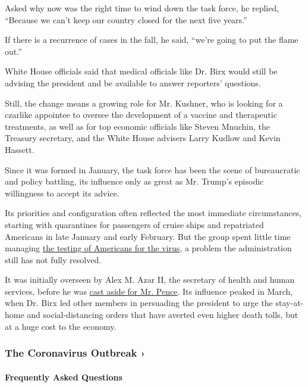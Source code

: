 Asked why now was the right time to wind down the task force, he
replied, ``Because we can't keep our country closed for the next five
years.''

If there is a recurrence of cases in the fall, he said, ``we're going to
put the flame out.''

White House officials said that medical officials like Dr. Birx would
still be advising the president and be available to answer reporters'
questions.

Still, the change means a growing role for Mr. Kushner, who is looking
for a czarlike appointee to oversee the development of a vaccine and
therapeutic treatments, as well as for top economic officials like
Steven Mnuchin, the Treasury secretary, and the White House advisers
Larry Kudlow and Kevin Hassett.

Since it was formed in January, the task force has been the scene of
bureaucratic and policy battling, its influence only as great as Mr.
Trump's episodic willingness to accept its advice.

Its priorities and configuration often reflected the most immediate
circumstances, starting with quarantines for passengers of cruise ships
and repatriated Americans in late January and early February. But the
group spent little time managing
\href{https://www.nytimes3xbfgragh.onion/2020/03/28/us/testing-coronavirus-pandemic.html}{the
testing of Americans for the virus}, a problem the administration still
has not fully resolved.

It was initially overseen by Alex M. Azar II, the secretary of health
and human services, before he was
\href{https://www.nytimes3xbfgragh.onion/2020/02/26/us/politics/trump-coronavirus-cdc.html}{cast
aside for Mr. Pence}. Its influence peaked in March, when Dr. Birx led
other members in persuading the president to urge the stay-at-home and
social-distancing orders that have averted even higher death tolls, but
at a huge cost to the economy.

\href{https://www.nytimes3xbfgragh.onion/news-event/coronavirus?action=click\&pgtype=Article\&state=default\&region=MAIN_CONTENT_3\&context=storylines_faq}{}

\hypertarget{the-coronavirus-outbreak-}{%
\subsubsection{The Coronavirus Outbreak
›}\label{the-coronavirus-outbreak-}}

\hypertarget{frequently-asked-questions}{%
\paragraph{Frequently Asked
Questions}\label{frequently-asked-questions}}

